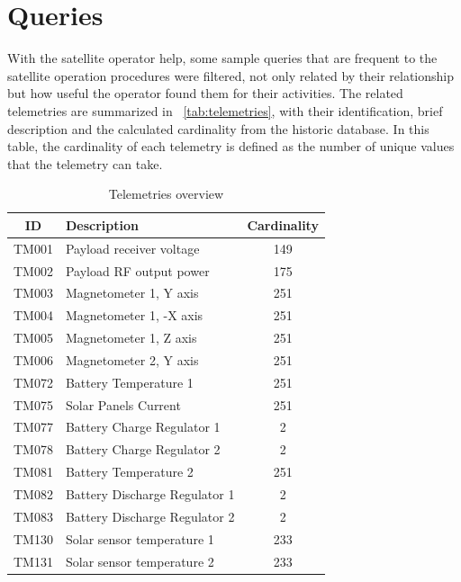 \section{Queries}\label{ch:querypart:queries}

With the satellite operator help, some sample queries that are frequent to the satellite operation procedures were filtered, not only related by their relationship but how useful the operator found them for their activities.
The related telemetries are summarized in ~\autoref{tab:telemetries}, with their identification, brief description and the calculated cardinality from the historic database.
In this table, the cardinality of each telemetry is defined as the number of unique values that the telemetry can take.

\begin{table}[!h]
  \begin{center}
    \caption{Telemetries overview}\label{tab:telemetries}
    \begin{tabular}{|c|p{6cm}|c|}
      \hline
      \textbf{ID} & \textbf{Description} & \textbf{Cardinality} \\
      \hline
      TM001 & Payload receiver voltage & 149 \\
      \hline
      TM002 & Payload RF output power & 175 \\
      \hline
      TM003 & Magnetometer 1, Y axis & 251 \\
      \hline
      TM004 & Magnetometer 1, -X axis & 251 \\
      \hline
      TM005 & Magnetometer 1, Z axis & 251 \\
      \hline
      TM006 & Magnetometer 2, Y axis & 251 \\
      \hline
      TM072 & Battery Temperature 1 & 251 \\
      \hline
      TM075 & Solar Panels Current & 251 \\
      \hline
      TM077 & Battery Charge Regulator 1 & 2 \\
      \hline
      TM078 & Battery Charge Regulator 2 & 2 \\
      \hline
      TM081 & Battery Temperature 2 & 251 \\
      \hline
      TM082 & Battery Discharge Regulator 1 & 2 \\
      \hline
      TM083 & Battery Discharge Regulator 2  & 2 \\
      \hline
      TM130 & Solar sensor temperature 1 & 233 \\
      \hline
      TM131 & Solar sensor temperature 2 & 233 \\
      \hline
    \end{tabular}
  \end{center}
\end{table}

